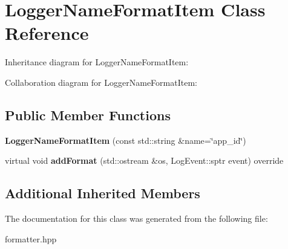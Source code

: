 \hypertarget{classLoggerNameFormatItem}{}\section{Logger\+Name\+Format\+Item Class Reference}
\label{classLoggerNameFormatItem}


Inheritance diagram for Logger\+Name\+Format\+Item\+:


Collaboration diagram for Logger\+Name\+Format\+Item\+:
\subsection*{Public Member Functions}
\begin{DoxyCompactItemize}
\item 
\mbox{\label{classLoggerNameFormatItem_af1297c1e4e13030729e63d34d35733b4}} 
{\bfseries Logger\+Name\+Format\+Item} (const std\+::string \&name=\char`\"{}app\+\_\+id\char`\"{})
\item 
\mbox{\label{classLoggerNameFormatItem_a1b124128ae70831c0f819380934714c0}} 
virtual void {\bfseries add\+Format} (std\+::ostream \&os, Log\+Event\+::sptr event) override
\end{DoxyCompactItemize}
\subsection*{Additional Inherited Members}


The documentation for this class was generated from the following file\+:\begin{DoxyCompactItemize}
\item 
formatter.\+hpp\end{DoxyCompactItemize}
